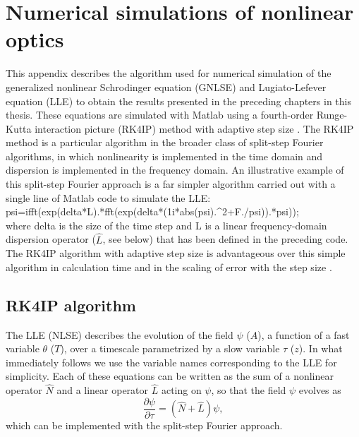 \chapter{Numerical simulations of nonlinear optics}
 \label{app:numericalsims}



This appendix describes the algorithm used for numerical simulation of the generalized nonlinear Schrodinger equation (GNLSE) and Lugiato-Lefever equation (LLE) to obtain the results presented in the preceding chapters in this thesis. These equations are simulated with Matlab using a fourth-order Runge-Kutta interaction picture (RK4IP) method \cite{Hult2007} with adaptive step size \cite{Heidt2009}. The RK4IP method is a particular algorithm in the broader class of split-step Fourier algorithms, in which nonlinearity is implemented in the time domain and dispersion is implemented in the frequency domain. An illustrative example of this split-step Fourier approach is a far simpler algorithm carried out with a single line of Matlab code to simulate the LLE: \\
{\selectfont psi=ifft(exp(delta*L).*fft(exp(delta*(1i*abs(psi).\string^2+F./psi)).*psi));}\\
where {\selectfont delta} is the size of the time step and {\selectfont L} is a linear frequency-domain dispersion operator ($\hat{L}$, see below) that has been defined in the preceding code. The RK4IP algorithm with adaptive step size is advantageous over this simple algorithm in calculation time and in the scaling of error with the step size \cite{Hult2007}.

\section{RK4IP algorithm}

The LLE (NLSE) describes the evolution of the field $\psi$ ($A$), a function of a fast variable $\theta$ ($T$), over a timescale parametrized by a slow variable $\tau$ ($z$). In what immediately follows we use the variable names corresponding to the LLE for simplicity. Each of these equations can be written as the sum of a nonlinear operator $\hat{N}$ and a linear operator $\hat{L}$ acting on $\psi$, so that the field $\psi$ evolves as
\begin{equation}
\frac{\partial\psi}{\partial\tau}=(\hat{N}+\hat{L})\psi,
\end{equation}
which can be implemented with the split-step Fourier approach.

